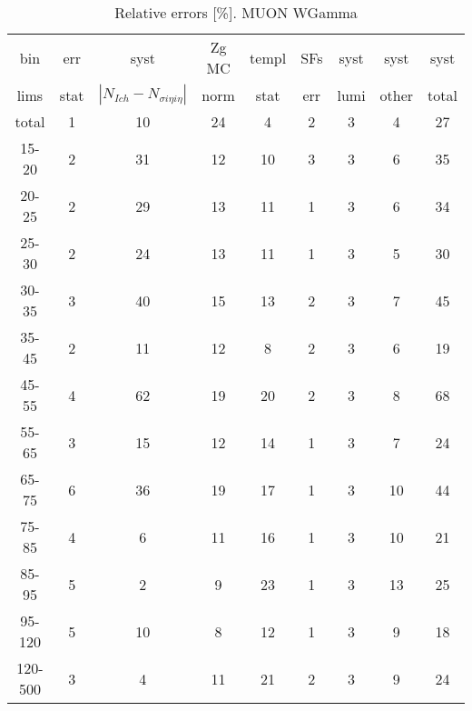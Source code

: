 \begin{table}[h]
  \scriptsize
  \begin{center}
  \caption{Relative errors [\%]. MUON WGamma}
   \begin{tabular}{|c|c|c|c|c|c|c|c|c|}
    bin  & err & syst & Zg MC & templ & SFs & syst & syst & syst\\
    lims  & stat & $|N_{Ich}-N_{\sigma{i\eta i\eta}}|$ & norm & stat & err & lumi & other & total\\ \hline
    total  & 1 & 10 & 24 & 4 & 2 & 3 & 4 & 27 \\ \hline
    15-20 & 2 & 31 & 12 & 10 & 3 & 3 & 6 & 35 \\ \hline
    20-25 & 2 & 29 & 13 & 11 & 1 & 3 & 6 & 34 \\ \hline
    25-30 & 2 & 24 & 13 & 11 & 1 & 3 & 5 & 30 \\ \hline
    30-35 & 3 & 40 & 15 & 13 & 2 & 3 & 7 & 45 \\ \hline
    35-45 & 2 & 11 & 12 & 8 & 2 & 3 & 6 & 19 \\ \hline
    45-55 & 4 & 62 & 19 & 20 & 2 & 3 & 8 & 68 \\ \hline
    55-65 & 3 & 15 & 12 & 14 & 1 & 3 & 7 & 24 \\ \hline
    65-75 & 6 & 36 & 19 & 17 & 1 & 3 & 10 & 44 \\ \hline
    75-85 & 4 & 6 & 11 & 16 & 1 & 3 & 10 & 21 \\ \hline
    85-95 & 5 & 2 & 9 & 23 & 1 & 3 & 13 & 25 \\ \hline
    95-120 & 5 & 10 & 8 & 12 & 1 & 3 & 9 & 18 \\ \hline
    120-500 & 3 & 4 & 11 & 21 & 2 & 3 & 9 & 24 \\ \hline
  \end{tabular}
  \label{tab:systInPercent_MUON_WGamma}
  \end{center}
\end{table}


